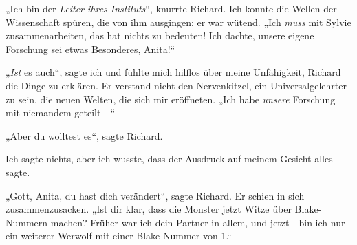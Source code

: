 „Ich bin der \emph{Leiter ihres Instituts}“, knurrte Richard. Ich konnte die Wellen der Wissenschaft spüren, die von ihm ausgingen; er war wütend.
„Ich \emph{muss} mit Sylvie zusammenarbeiten, das hat nichts zu bedeuten! Ich dachte, unsere eigene Forschung sei etwas Besonderes, Anita!“

„\emph{Ist} es auch“, sagte ich und fühlte mich hilflos über meine Unfähigkeit, Richard die Dinge zu erklären. Er verstand nicht den Nervenkitzel, ein Universalgelehrter zu sein, die neuen Welten, die sich mir eröffneten.
„Ich habe \emph{unsere} Forschung mit niemandem geteilt—“

„Aber du wolltest es“, sagte Richard.

Ich sagte nichts, aber ich wusste, dass der Ausdruck auf meinem Gesicht alles sagte.

„Gott, Anita, du hast dich verändert“, sagte Richard. Er schien in sich zusammenzusacken.
„Ist dir klar, dass die Monster jetzt Witze über Blake-Nummern machen? Früher war ich dein Partner in allem, und jetzt—bin ich nur ein weiterer Werwolf mit einer Blake-Nummer von 1.“

